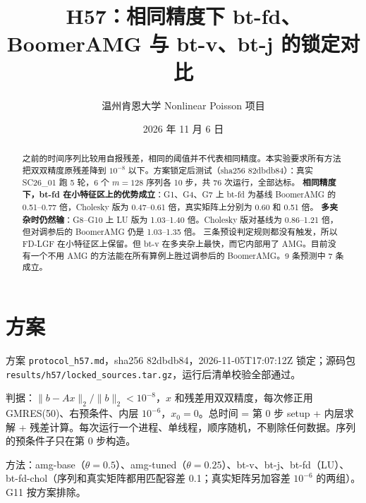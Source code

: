\documentclass[11pt,a4paper]{ctexart}
\title{H57：相同精度下 bt-fd、BoomerAMG 与 bt-v、bt-j 的锁定对比}
\author{温州肯恩大学 \quad Nonlinear Poisson 项目}
\date{2026 年 11 月 6 日}
\begin{document}
\maketitle
\sloppy

\begin{abstract}
之前的时间序列比较用自报残差，相同的阈值并不代表相同精度。本实验要求所有方法把双双精度原残差降到 $10^{-8}$ 以下。方案锁定后测试（sha256 82dbdb84）：真实 SC26\_01 跑 5 轮，6 个 $m=128$ 序列各 10 步，共 76 次运行，全部达标。
\textbf{相同精度下，bt-fd 在小特征区上的优势成立}：G1、G4、G7 上 bt-fd 为基线 BoomerAMG 的 0.51--0.77 倍，Cholesky 版为 0.47--0.61 倍，真实矩阵上分别为 0.60 和 0.51 倍。
\textbf{多夹杂时仍然输}：G8--G10 上 LU 版为 1.03--1.40 倍。Cholesky 版对基线为 0.86--1.21 倍，但对调参后的 BoomerAMG 仍是 1.03--1.35 倍。
三条预设判定规则都没有触发，所以 FD-LGF 在小特征区上保留。但 bt-v 在多夹杂上最快，而它内部用了 AMG。目前没有一个不用 AMG 的方法能在所有算例上胜过调参后的 BoomerAMG。9 条预测中 7 条成立。
\end{abstract}

\section{方案}
方案 \texttt{protocol\_h57.md}，sha256 82dbdb84，2026-11-05T17:07:12Z 锁定；源码包 \texttt{results/h57/locked\_sources.tar.gz}，运行后清单校验全部通过。

判据：$\|b-Ax\|_2/\|b\|_2<10^{-8}$，$x$ 和残差用双双精度，每次修正用 GMRES(50)、右预条件、内层 $10^{-6}$，$x_0=0$。总时间 = 第 0 步 setup + 内层求解 + 残差计算。每次运行一个进程、单线程，顺序随机，不剔除任何数据。序列的预条件子只在第 0 步构造。

方法：amg-base（$\theta=0.5$）、amg-tuned（$\theta=0.25$）、bt-v、bt-j、bt-fd（LU）、bt-fd-chol（序列和真实矩阵都用匹配容差 0.1；真实矩阵另加容差 $10^{-6}$ 的两组）。G11 按方案排除。
\end{document}
